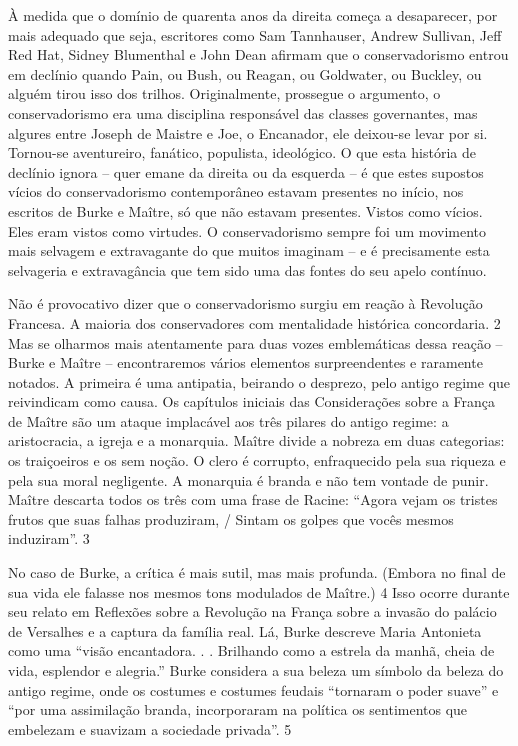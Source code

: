 \par
 
À medida que o domínio de quarenta anos da direita começa a desaparecer, por mais adequado que seja, escritores como Sam Tannhauser, Andrew Sullivan, Jeff Red Hat, Sidney Blumenthal e John Dean afirmam que o conservadorismo entrou em declínio quando Pain, ou Bush, ou Reagan, ou Goldwater, ou Buckley, ou alguém tirou isso dos trilhos. Originalmente, prossegue o argumento, o conservadorismo era uma disciplina responsável das classes governantes, mas algures entre Joseph de Maistre e Joe, o Encanador, ele deixou-se levar por si. Tornou-se aventureiro, fanático, populista, ideológico. O que esta história de declínio ignora – quer emane da direita ou da esquerda – é que estes supostos vícios do conservadorismo contemporâneo estavam presentes no início, nos escritos de Burke e Maître, só que não estavam presentes. Vistos como vícios. Eles eram vistos como virtudes. O conservadorismo sempre foi um movimento mais selvagem e extravagante do que muitos imaginam – e é precisamente esta selvageria e extravagância que tem sido uma das fontes do seu apelo contínuo.
 
\par
 
Não é provocativo dizer que o conservadorismo surgiu em reação à Revolução Francesa. A maioria dos conservadores com mentalidade histórica concordaria.
 {\color{blue} 2}  
Mas se olharmos mais atentamente para duas vozes emblemáticas dessa reação – Burke e Maître – encontraremos vários elementos surpreendentes e raramente notados. A primeira é uma antipatia, beirando o desprezo, pelo antigo regime que reivindicam como causa. Os capítulos iniciais das Considerações sobre a França de Maître são um ataque implacável aos três pilares do antigo regime: a aristocracia, a igreja e a monarquia. Maître divide a nobreza em duas categorias: os traiçoeiros e os sem noção. O clero é corrupto, enfraquecido pela sua riqueza e pela sua moral negligente. A monarquia é branda e não tem vontade de punir. Maître descarta todos os três com uma frase de Racine: “Agora vejam os tristes frutos que suas falhas produziram, / Sintam os golpes que vocês mesmos induziram”.
 {\color{blue} 3}  

 
\par
 
No caso de Burke, a crítica é mais sutil, mas mais profunda. (Embora no final de sua vida ele falasse nos mesmos tons modulados de Maître.)
 {\color{blue} 4}  
Isso ocorre durante seu relato em Reflexões sobre a Revolução na França sobre a invasão do palácio de Versalhes e a captura da família real. Lá, Burke descreve Maria Antonieta como uma “visão encantadora. . . Brilhando como a estrela da manhã, cheia de vida, esplendor e alegria.” Burke considera a sua beleza um símbolo da beleza do antigo regime, onde os costumes e costumes feudais “tornaram o poder suave” e “por uma assimilação branda, incorporaram na política os sentimentos que embelezam e suavizam a sociedade privada”.
 {\color{blue} 5}  

